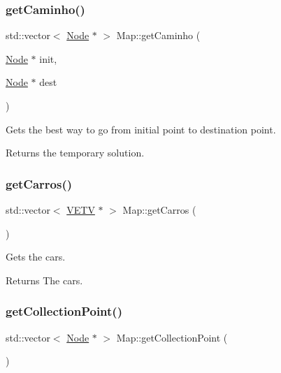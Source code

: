 \subsubsection{\texorpdfstring{getCaminho()}{getCaminho()}}
{\footnotesize\ttfamily std\+::vector$<$ \mbox{\hyperlink{class_node}{Node}} $\ast$ $>$ Map\+::get\+Caminho (\begin{DoxyParamCaption}\item[{\mbox{\hyperlink{class_node}{Node}} $\ast$}]{init,  }\item[{\mbox{\hyperlink{class_node}{Node}} $\ast$}]{dest }\end{DoxyParamCaption})}



Gets the best way to go from initial point to destination point. 

\begin{DoxyReturn}{Returns}
the temporary solution. 
\end{DoxyReturn}
\mbox{\label{class_map_a218f885f5ceecd3ac40b91cd4f79c545}} 
\subsubsection{\texorpdfstring{getCarros()}{getCarros()}}
{\footnotesize\ttfamily std\+::vector$<$ \mbox{\hyperlink{class_v_e_t_v}{V\+E\+TV}} $\ast$ $>$ Map\+::get\+Carros (\begin{DoxyParamCaption}{ }\end{DoxyParamCaption})}



Gets the cars. 

\begin{DoxyReturn}{Returns}
The cars. 
\end{DoxyReturn}
\mbox{\label{class_map_ab4147e61d5abf3134ec7c4701f539f4b}} 
\subsubsection{\texorpdfstring{getCollectionPoint()}{getCollectionPoint()}}
{\footnotesize\ttfamily std\+::vector$<$ \mbox{\hyperlink{class_node}{Node}} $\ast$ $>$ Map\+::get\+Collection\+Point (\begin{DoxyParamCaption}{ }\end{DoxyParamCaption})}



